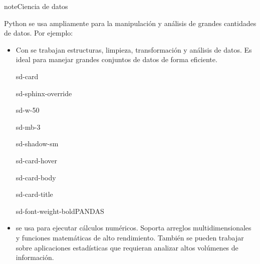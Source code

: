 \documentclass[letterpaper,10pt,spanish]{sphinxmanual}
\begin{document}
\begin{sphinxadmonition}{note}{Ciencia de datos}

\sphinxAtStartPar
Python se usa ampliamente para la manipulación y análisis de grandes cantidades de datos. Por ejemplo:
\begin{itemize}
\item {} 
\sphinxAtStartPar
Con  se trabajan estructuras, limpieza, transformación y análisis de datos. Es ideal para manejar grandes conjuntos de datos de forma eficiente.

\begin{sphinxuseclass}{sd-card}
\begin{sphinxuseclass}{sd-sphinx-override}
\begin{sphinxuseclass}{sd-w-50}
\begin{sphinxuseclass}{sd-mb-3}
\begin{sphinxuseclass}{sd-shadow-sm}
\begin{sphinxuseclass}{sd-card-hover}
\begin{sphinxuseclass}{sd-card-body}
\begin{sphinxuseclass}{sd-card-title}
\begin{sphinxuseclass}{sd-font-weight-bold}PANDAS
\end{sphinxuseclass}
\end{sphinxuseclass}
\end{sphinxuseclass}
\noindent{}
\end{sphinxuseclass}
\end{sphinxuseclass}
\end{sphinxuseclass}
\end{sphinxuseclass}
\end{sphinxuseclass}
\end{sphinxuseclass}
\item {} 
\sphinxAtStartPar
{} se usa para ejecutar cálculos numéricos. Soporta arreglos multidimensionales y funciones matemáticas de alto rendimiento. También se pueden trabajar sobre aplicaciones estadísticas que requieran analizar altos volúmenes de información.


\end{itemize}
\end{sphinxadmonition}
\end{document}
